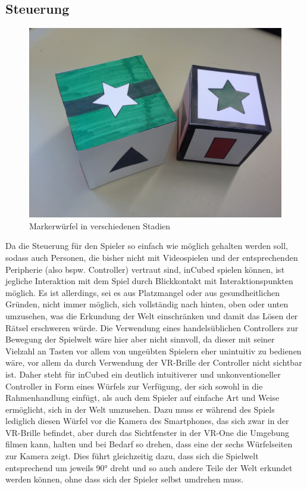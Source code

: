 \subsection{Steuerung}
 \label{Marker}

\begin{figure}[!htbp]%
	\centering
		\includegraphics[width=1.0\textwidth]{images/wuerfel}
	\caption{Markerwürfel in verschiedenen Stadien}
	\label{fig:Wuerfel}
\end{figure}

Da die Steuerung für den Spieler so einfach wie möglich gehalten werden soll, sodass auch Personen, die bisher nicht mit Videospielen und der entsprechenden Peripherie (also bspw. Controller) vertraut sind, inCubed spielen können, ist jegliche Interaktion mit dem Spiel durch Blickkontakt mit Interaktionspunkten möglich. Es ist allerdings, sei es aus Platzmangel oder aus gesundheitlichen Gründen, nicht immer möglich, sich vollständig nach hinten, oben oder unten umzusehen, was die Erkundung der Welt einschränken und damit das Lösen der Rätsel erschweren würde. Die Verwendung eines handelsüblichen Controllers zur Bewegung der Spielwelt wäre hier aber nicht sinnvoll, da dieser mit seiner Vielzahl an Tasten vor allem von ungeübten Spielern eher unintuitiv zu bedienen wäre, vor allem da durch Verwendung der VR-Brille der Controller nicht sichtbar ist. Daher steht für inCubed ein deutlich intuitiverer und unkonventioneller Controller in Form eines Würfels zur Verfügung, der sich sowohl in die Rahmenhandlung einfügt, als auch dem Spieler auf einfache Art und Weise ermöglicht, sich in der Welt umzusehen. Dazu muss er während des Spiels lediglich diesen Würfel vor die Kamera des Smartphones, das sich zwar in der VR-Brille befindet, aber durch das Sichtfenster in der VR-One die Umgebung filmen kann, halten und bei Bedarf so drehen, dass eine der sechs Würfelseiten zur Kamera zeigt. Dies führt gleichzeitig dazu, dass sich die Spielwelt entsprechend um jeweils 90° dreht und so auch andere Teile der Welt erkundet werden können, ohne dass sich der Spieler selbst umdrehen muss.

